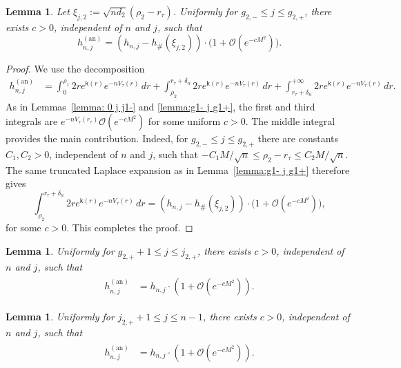 \documentclass[a4paper]{article}
\newtheorem{lemma}[theorem]{Lemma}
\numberwithin{equation}{section}
\begin{document}
\begin{lemma}\label{lemma:g2- j g2+}
Let $\xi_{j,2}:=\sqrt{nd_2}(\rho_2-r_{\tau})$. 
Uniformly for $g_{2,-}\leq j\leq g_{2,+}$, there exists $c>0$, independent of $n$ and $j$, such that
\begin{equation}
   h_{n,j}^{(\mathrm{an})}=
    (h_{n,j}-h_{\#}(\xi_{j,2}))\cdot\bigl(1+\mathcal{O}(e^{-cM^2})\bigr).
\end{equation}
\end{lemma}

\begin{proof}
We use the decomposition
\begin{align*}
h_{n,j}^{(\mathrm{an})}&=\int_{0}^{\rho_1}2re^{\mathsf{k}(r)}e^{-nV_{\tau}(r)}\,dr+\int_{\rho_2}^{r_{\tau}+\delta_n}2re^{\mathsf{k}(r)}e^{-nV_{\tau}(r)}\,dr
+\int_{r_{\tau}+\delta_n}^{+\infty}2re^{\mathsf{k}(r)}e^{-nV_{\tau}(r)}\,dr. 
\end{align*}
As in Lemmas~\ref{lemma: 0 j j1-} and \ref{lemma:g1- j g1+}, the first and third integrals are $e^{-nV_\tau(r_\tau)}\mathcal O(e^{-cM^2})$ for some uniform $c>0$. The middle integral provides the main contribution. Indeed, for $g_{2,-}\leq j\leq g_{2,+}$ there are constants $C_1,C_2>0$, independent of $n$ and $j$, such that
$-C_1M/\sqrt n\leq\rho_2-r_\tau\leq C_2M/\sqrt n$. The same truncated Laplace expansion as in Lemma~\ref{lemma:g1- j g1+} therefore gives
\[
\int_{\rho_2}^{r_{\tau}+\delta_n}2re^{\mathsf{k}(r)}e^{-nV_{\tau}(r)}\,dr
=
(h_{n,j}-h_{\#}(\xi_{j,2}))\cdot\bigl(1+\mathcal{O}(e^{-cM^2})\bigr),
\]
for some $c>0$. 
This completes the proof. 
\end{proof}


\begin{lemma}\label{lemma:g2,++1leq j leq j2,+}
Uniformly for $g_{2,+}+1\leq j\leq j_{2,+}$, there exists $c>0$, independent of $n$ and $j$, such that
\begin{align}
\begin{split}
h_{n,j}^{(\mathrm{an})}
&=h_{n,j}\cdot(1+\mathcal{O}(e^{-c M^2})).
\end{split}
\end{align}
\end{lemma}

\begin{lemma}\label{lemma:j2,++1leq j leq n-1}
Uniformly for $j_{2,+}+1\leq j\leq n-1$, there exists $c>0$, independent of $n$ and $j$, such that
\begin{align}
\begin{split}
h_{n,j}^{(\mathrm{an})}
&=h_{n,j}\cdot(1+\mathcal{O}(e^{-cM^2})).
\end{split}
\end{align}
\end{lemma}
\end{document}
